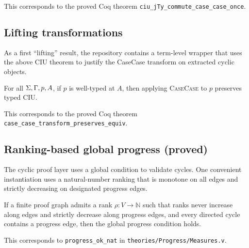 This corresponds to the proved Coq theorem \texttt{ciu\_jTy\_commute\_case\_case\_once}.

\subsection{Lifting transformations}

As a first ``lifting'' result, the repository contains a term-level wrapper that uses the above CIU theorem to justify the CaseCase transform on extracted cyclic objects.

\begin{theorem}
\label{thm:casecase-lifted}
For all \(\Sigma,\Gamma,p,A\), if \(p\) is well-typed at \(A\), then applying \textsc{CaseCase} to \(p\) preserves typed CIU.
\end{theorem}

This corresponds to the proved Coq theorem \texttt{case\_case\_transform\_preserves\_equiv}.

\subsection{Ranking-based global progress (proved)}

The cyclic proof layer uses a global condition to validate cycles.
One convenient instantiation uses a natural-number ranking that is monotone on all edges and strictly decreasing on designated progress edges.

\begin{proposition}
\label{prop:ranking-nat}
If a finite proof graph admits a rank \(\rho : V \to \mathbb{N}\) such that ranks never increase along edges and strictly decrease along progress edges, and every directed cycle contains a progress edge, then the global progress condition holds.
\end{proposition}

This corresponds to \texttt{progress\_ok\_nat} in \texttt{theories/Progress/Measures.v}.
